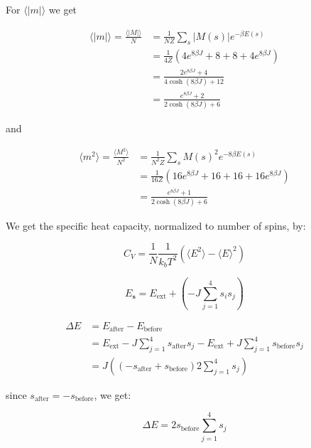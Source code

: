 \documentclass[english,notitlepage,reprint,nofootinbib]{revtex4-1}  %
\begin{document}
For $\langle|m|\rangle$ we get

\begin{align*}
    \langle|m|\rangle  = \frac{\langle|M|\rangle}{N} &= \frac{1}{N Z} \sum\limits_{s} |M(s)| e^{- \beta E(s)} \\
    &= \frac{1}{4 Z} \left( 4 e^{8 \beta J} + 8 + 8 + 4 e^{8 \beta J} \right) \\
    &= \frac{2 e^{8 \beta J}  + 4}{4 \cosh (8 \beta J) + 12} \\
    &= \frac{e^{8 \beta J}  + 2}{2 \cosh (8 \beta J) + 6}
\end{align*}

and 

\begin{align*}
    \langle m^2\rangle = \frac{\langle M^2\rangle}{N^2} &= \frac{1}{N^2 Z} \sum\limits_{s} M(s)^2 e^{-8 \beta E(s)} \\
    &= \frac{1}{16 Z} \left( 16 e^{8 \beta J} + 16 + 16 + 16 e^{8 \beta J} \right) \\
    &= \frac{e^{8 \beta J}  + 1}{2 \cosh (8 \beta J) + 6}
\end{align*}

We get the specific heat capacity, normalized to number of spins, by:

\begin{equation}
	C_V = \frac{1}{N}\frac{1}{k_bT^2}\left(\langle E^2\rangle - \langle E\rangle^2\right)
\end{equation}


\begin{equation}
    E_{\mathbf{s}} = E_{\text{ext}} + \left( -J \sum\limits_{j = 1}^4 s_i s_j \right)
\end{equation}

\begin{align*}
    \Delta E &= E_{\text{after}} - E_{\text{before}} \\
    &= E_{\text{ext}} - J \sum\limits_{j = 1}^4 s_{\text{after}} s_j - E_{\text{ext}} + J \sum\limits_{j = 1}^4 s_{\text{before}} s_j \\
    &= J \left( \left( -s_ \text{after} + s_{\text{before}} \right) 2 \sum\limits_{j = 1}^4 s_j \right)
\end{align*}

since $s_{\text{after}} = - s_{\text{before}}$, we get:

\begin{equation}
    \Delta E = 2 s_{\text{before}} \sum\limits_{j = 1}^4 s_j
\end{equation}
\end{document}
